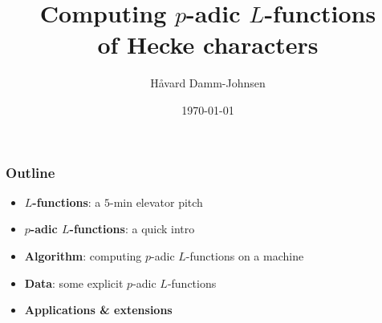\documentclass[10pt]{beamer}
\begin{document}
\title{Computing $p$-adic $L$-functions \\ \normalsize of Hecke characters}
\author{Håvard Damm-Johnsen}
\date{\today}

\maketitle
\begin{frame}
  \frametitle{Outline}

  \begin{itemize}[itemsep=5pt]
  \item \textbf{$L$-functions}: a $5$-min elevator pitch\pause
    
  \item \textbf{$p$-adic $L$-functions}: a quick intro \pause

  \item \textbf{Algorithm}: computing $p$-adic $L$-functions on a machine\pause

  \item \textbf{Data}: some explicit $p$-adic $L$-functions\pause

  \item \textbf{Applications \& extensions}     
  \end{itemize}

  
\end{frame}
\end{document}
